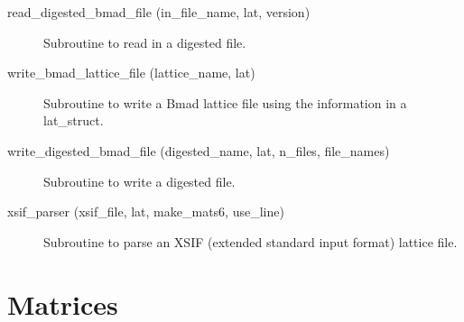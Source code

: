 \begin{description}
\label{r:read.digested.bmad.file}
\item[read_digested_bmad_file (in_file_name, lat, version)] \Newline
Subroutine to read in a digested file. 

\label{r:write.bmad.lattice.file}
\item[write_bmad_lattice_file (lattice_name, lat)] \Newline 
Subroutine to write a Bmad lattice file using the information in
a lat_struct.

\label{r:write.digested.bmad.file}
\item[write_digested_bmad_file (digested_name, lat, n_files, file_names)] \Newline
Subroutine to write a digested file. 

\label{r:xsif.parser}
\item[xsif_parser (xsif_file, lat, make_mats6, use_line)] \Newline 
     Subroutine to parse an XSIF (extended standard input format) lattice file.

\end{description}

\section{Matrices}
\label{r:mat}

